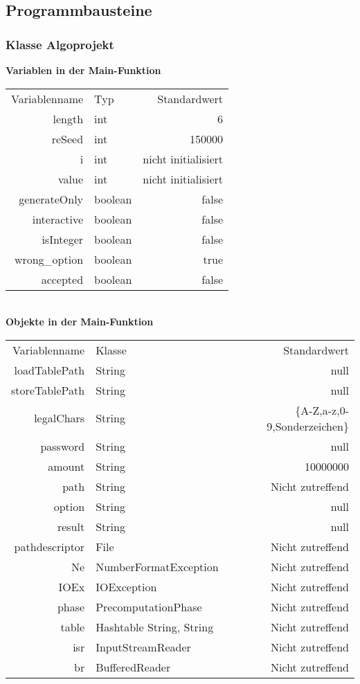 \documentclass[11pt]{article}
\begin{document}
  \subsection{Programmbausteine}
  \subsubsection{Klasse Algoprojekt}

  \textbf{Variablen in der Main-Funktion}\\
  \begin{tabular}{rlr}
  Variablenname & Typ & Standardwert \\
  length & int & 6 \\
  reSeed & int & 150000 \\
  i & int & nicht initialisiert \\
  value & int & nicht initialisiert \\
  generateOnly & boolean & false \\
  interactive & boolean & false \\
  isInteger & boolean & false \\
  wrong\_option & boolean & true \\
  accepted & boolean & false \\
  
  \end{tabular}\\
  \textbf{Objekte in der Main-Funktion}\\
  \begin{tabular}{rlr}
  Variablenname & Klasse & Standardwert \\
    loadTablePath & String & null \\
  storeTablePath & String & null \\
  legalChars & String & \{A-Z,a-z,0-9,Sonderzeichen\} \\
  password & String & null \\
  amount & String & 10000000 \\
  path & String & Nicht zutreffend \\
  option & String & null \\
  result & String & null \\
  pathdescriptor & File & Nicht zutreffend\\
  Ne & NumberFormatException & Nicht zutreffend \\
  IOEx & IOException & Nicht zutreffend \\
  phase & PrecomputationPhase & Nicht zutreffend \\
  table & Hashtable String, String & Nicht zutreffend \\
  isr & InputStreamReader & Nicht zutreffend \\
  br & BufferedReader & Nicht zutreffend \\
  
  \end{tabular}
\end{document}
